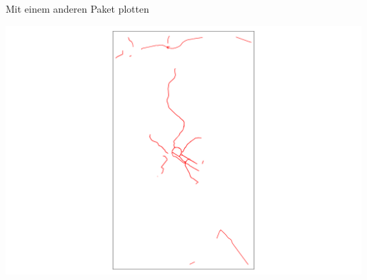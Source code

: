 \documentclass[ignorenonframetext,]{beamer}
\newenvironment{Shaded}{\begin{snugshade}}{\end{snugshade}}
\newcommand{\KeywordTok}[1]{\textcolor[rgb]{0.13,0.29,0.53}{\textbf{#1}}}
\newcommand{\OperatorTok}[1]{\textcolor[rgb]{0.81,0.36,0.00}{\textbf{#1}}}
\newcommand{\NormalTok}[1]{#1}
\begin{document}
\begin{frame}[fragile]{Mit einem anderen Paket plotten}

\begin{Shaded}
\end{Shaded}

\includegraphics{slides_all2gether_part2_files/figure-beamer/unnamed-chunk-80-1.pdf}

\end{frame}
\end{document}
